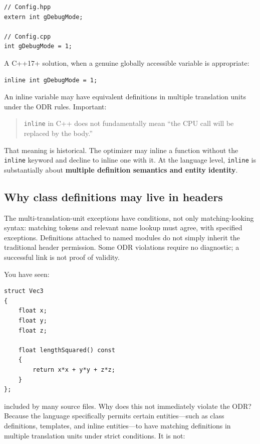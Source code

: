 \begin{verbatim}
// Config.hpp
extern int gDebugMode;

// Config.cpp
int gDebugMode = 1;
\end{verbatim}

A C++17+ solution, when a genuine globally accessible variable is appropriate:

\begin{verbatim}
inline int gDebugMode = 1;
\end{verbatim}

An inline variable may have equivalent definitions in multiple translation units under the ODR rules. Important:

\begin{quote}
\texttt{inline} in C++ does not fundamentally mean ``the CPU call will be replaced by the body.''
\end{quote}

That meaning is historical. The optimizer may inline a function without the \texttt{inline} keyword and decline to inline one with it. At the language level, \texttt{inline} is substantially about \textbf{multiple definition semantics and entity identity}.

\subsection{Why class definitions may live in headers}\label{05-engine-i-ch002-why-class-definitions-may-live-in-headers}

\hypertarget{05-engine-i-ch002-why-class-definitions-may-live-in-headers}{}

The multi-translation-unit exceptions have conditions, not only matching-looking syntax: matching tokens and relevant name lookup must agree, with specified exceptions. Definitions attached to named modules do not simply inherit the traditional header permission. Some ODR violations require no diagnostic; a successful link is not proof of validity.

You have seen:

\begin{verbatim}
struct Vec3
{
    float x;
    float y;
    float z;

    float lengthSquared() const
    {
        return x*x + y*y + z*z;
    }
};
\end{verbatim}

included by many source files. Why does this not immediately violate the ODR? Because the language specifically permits certain entities---such as class definitions, templates, and inline entities---to have matching definitions in multiple translation units under strict conditions. It is not:

